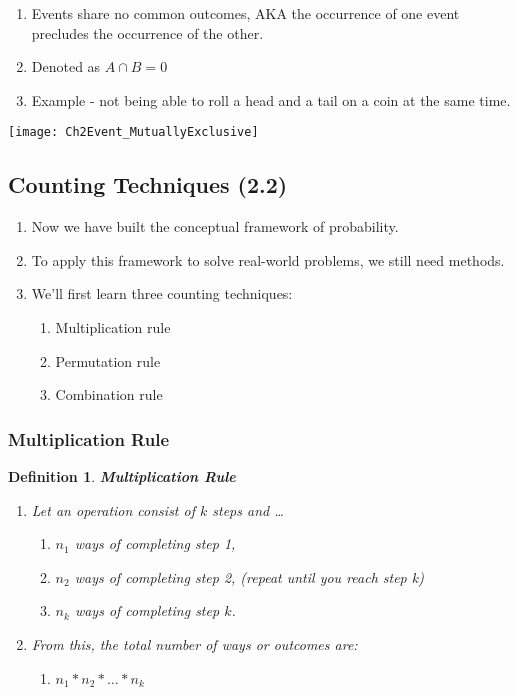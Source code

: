 \documentclass[../IND E 315.tex]{subfiles}
\newtheorem{defn}{Definition}
\begin{document}
\begin{enumerate}
        \begin{enumerate}
            \item Events share no common outcomes, AKA the occurrence of one event precludes the occurrence of the other.
            \item Denoted as $A \cap B = 0$ 
            \item Example - not being able to roll a head and a tail on a coin at the same time.
        \end{enumerate}
        \begin{center}
            \texttt{[image: Ch2Event\_MutuallyExclusive]}
        \end{center}
\end{enumerate}

\subsection*{Counting Techniques (2.2)}
\begin{enumerate}
    \item Now we have built the conceptual framework of probability.
    \item To apply this framework to solve real-world problems, we still need methods. 
    \item We'll first learn three counting techniques:
        \begin{enumerate}
            \item Multiplication rule
            \item Permutation rule
            \item Combination rule
        \end{enumerate}
\end{enumerate}

\subsubsection*{Multiplication Rule}
\begin{defn}
    \textbf{Multiplication Rule}
    \begin{enumerate}
        \item Let an operation consist of $k$ steps and \dots 
            \begin{enumerate}
                \item $n_1$ ways of completing step 1, 
                \item $n_2$ ways of completing step 2, (repeat until you reach step k)
                \item $n_k$ ways of completing step $k$.
            \end{enumerate}
        \item From this, the total number of ways or outcomes are:
            \begin{enumerate}
                \item $n_1 * n_2 * \dots * n_k$
            \end{enumerate}
    \end{enumerate}
\end{defn}
\end{document}
